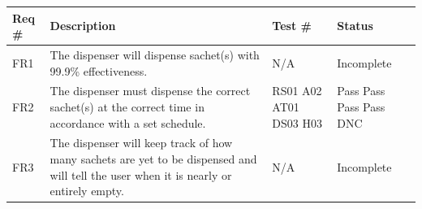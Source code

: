 \documentclass[12pt]{article}
\begin{document}
\begin{longtable}{|p{}|p{}|p{}|p{}|}
        \hline
        Req \# & Description & Test \# & Status \\ \hline
FR1 & The dispenser will dispense sachet(s) with 99.9\% effectiveness. 
& N/A & Incomplete       \\ \hline
FR2    & The dispenser must dispense the correct sachet(s) at the correct time in accordance with a set schedule. 
& RS01 \newline 
A02 \newline
AT01 \newline
DS03 \newline
H03
& Pass \newline
Pass \newline
Pass \newline
Pass \newline
DNC
\\ \hline
FR3    & The dispenser will keep track of how many sachets are yet to be dispensed and will tell the user when it is nearly or entirely empty.
& N/A  & Incomplete    \\ \hline


\end{longtable}
\end{document}
